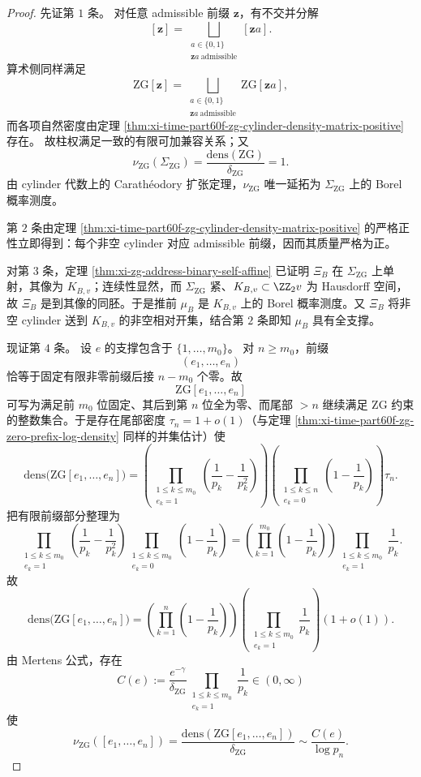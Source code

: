 \begin{proof}
先证第 \(1\) 条。
对任意 admissible 前缀 \(\mathbf z\)，有不交并分解
\[
[\mathbf z]
=
\bigsqcup_{\substack{a\in\{0,1\}\\ \mathbf z a\ \mathrm{admissible}}}
[\mathbf z a].
\]
算术侧同样满足
\[
\mathrm{ZG}[\mathbf z]
=
\bigsqcup_{\substack{a\in\{0,1\}\\ \mathbf z a\ \mathrm{admissible}}}
\mathrm{ZG}[\mathbf z a],
\]
而各项自然密度由定理
\ref{thm:xi-time-part60f-zg-cylinder-density-matrix-positive}
存在。
故柱权满足一致的有限可加兼容关系；又
\[
\nu_{\mathrm{ZG}}(\Sigma_{\mathrm{ZG}})
=
\frac{\mathrm{dens}(\mathrm{ZG})}{\delta_{\mathrm{ZG}}}
=1.
\]
由 cylinder 代数上的 Carath\'eodory 扩张定理，\(\nu_{\mathrm{ZG}}\) 唯一延拓为 \(\Sigma_{\mathrm{ZG}}\) 上的 Borel 概率测度。

第 \(2\) 条由定理 \ref{thm:xi-time-part60f-zg-cylinder-density-matrix-positive} 的严格正性立即得到：每个非空 cylinder 对应 admissible 前缀，因而其质量严格为正。

对第 \(3\) 条，定理 \ref{thm:xi-zg-address-binary-self-affine} 已证明 \(\Xi_B\) 在 \(\Sigma_{\mathrm{ZG}}\) 上单射，其像为 \(K_{B,v}\)；连续性显然，而 \(\Sigma_{\mathrm{ZG}}\) 紧、\(K_{B,v}\subset \ZZ_2v\) 为 Hausdorff 空间，故 \(\Xi_B\) 是到其像的同胚。于是推前 \(\mu_B\) 是 \(K_{B,v}\) 上的 Borel 概率测度。又 \(\Xi_B\) 将非空 cylinder 送到 \(K_{B,v}\) 的非空相对开集，结合第 \(2\) 条即知 \(\mu_B\) 具有全支撑。

现证第 \(4\) 条。
设 \(e\) 的支撑包含于 \(\{1,\dots,m_0\}\)。
对 \(n\ge m_0\)，前缀
\[
(e_1,\dots,e_n)
\]
恰等于固定有限非零前缀后接 \(n-m_0\) 个零。故
\[
\mathrm{ZG}[e_1,\dots,e_n]
\]
可写为满足前 \(m_0\) 位固定、其后到第 \(n\) 位全为零、而尾部 \(>n\) 继续满足 \(\mathrm{ZG}\) 约束的整数集合。于是存在尾部密度 \(\tau_n=1+o(1)\)（与定理 \ref{thm:xi-time-part60f-zg-zero-prefix-log-density} 同样的并集估计）使
\[
\mathrm{dens}\bigl(\mathrm{ZG}[e_1,\dots,e_n]\bigr)
=
\left(\prod_{\substack{1\le k\le m_0\\ e_k=1}}
\left(\frac1{p_k}-\frac1{p_k^2}\right)\right)
\left(\prod_{\substack{1\le k\le n\\ e_k=0}}
\left(1-\frac1{p_k}\right)\right)\tau_n.
\]
把有限前缀部分整理为
\[
\prod_{\substack{1\le k\le m_0\\ e_k=1}}
\left(\frac1{p_k}-\frac1{p_k^2}\right)
\prod_{\substack{1\le k\le m_0\\ e_k=0}}
\left(1-\frac1{p_k}\right)
=
\left(\prod_{k=1}^{m_0}\left(1-\frac1{p_k}\right)\right)
\prod_{\substack{1\le k\le m_0\\ e_k=1}}\frac1{p_k}.
\]
故
\[
\mathrm{dens}\bigl(\mathrm{ZG}[e_1,\dots,e_n]\bigr)
=
\left(\prod_{k=1}^{n}\left(1-\frac1{p_k}\right)\right)
\left(\prod_{\substack{1\le k\le m_0\\ e_k=1}}\frac1{p_k}\right)
(1+o(1)).
\]
由 Mertens 公式，存在
\[
C(e):=
\frac{e^{-\gamma}}{\delta_{\mathrm{ZG}}}
\prod_{\substack{1\le k\le m_0\\ e_k=1}}\frac1{p_k}
\in(0,\infty)
\]
使
\[
\nu_{\mathrm{ZG}}([e_1,\dots,e_n])
=
\frac{\mathrm{dens}(\mathrm{ZG}[e_1,\dots,e_n])}{\delta_{\mathrm{ZG}}}
\sim
\frac{C(e)}{\log p_n}.
\]


\end{proof}
